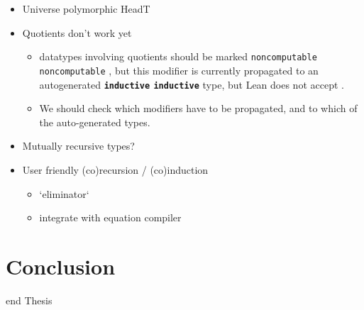 \documentclass[titlepage]{report}
\newenvironment{todo}{%
\definecolor{shadecolor}{HTML}{F8E0E0}%
\begin{shaded}%
\begin{trivlist}                         
    \item[\hskip \labelsep {\bfseries Todo:}]}{\end{trivlist}\end{shaded}}
\newenvironment{leanhidden}{\expandafter\comment}{\expandafter\endcomment}
\newcommand\lean[1]{%
\ifx\leanmode\undefined%
\def\leanmode{1}%
\texttt{\small #1}%
\undef\leanmode%
\else%
\texttt{#1}%
\fi%
}
\newcommand\keyword[1]{{\color{keywordcolor} \textbf{\lean{#1}}}}
\newcommand\inductive{{\keyword{inductive}}}
\begin{document}
\begin{todo}
    


    \begin{itemize}
        \item Universe polymorphic HeadT
        
        \item Quotients don't work yet
              \begin{itemize}
                \item datatypes involving quotients should be marked \lean{noncomputable}, but this modifier is currently propagated to an autogenerated \inductive{} type, but Lean does not accept .

                \item We should check which modifiers have to be propagated, and to which of the auto-generated types.
              \end{itemize}
        

        \item Mutually recursive types?
        
        \item User friendly (co)recursion / (co)induction
                \begin{itemize}
                    \item `eliminator`
                    \item integrate with equation compiler
                \end{itemize}
    \end{itemize}
\end{todo}









\chapter{Conclusion}
\label{ch:conclusion}















\begin{leanhidden}
    end Thesis
\end{leanhidden}





\end{document}
